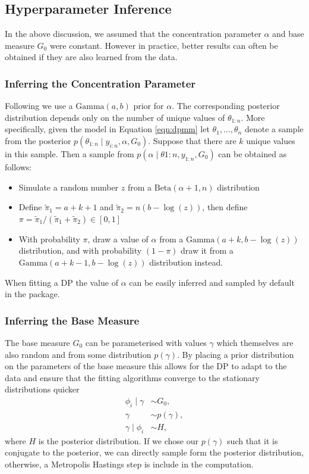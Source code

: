 \documentclass[nojss]{jss}
\begin{document}
\subsection{Hyperparameter Inference} \label{subsec:hyperparam}

In the above discussion, we assumed that the concentration parameter $\alpha$ and base measure $G_0$ were constant. However in practice, better results can often be obtained if they are also learned from the data.

\subsubsection{Inferring the Concentration Parameter}
Following \cite{west_hyperparameter_1992} we use a $\text{Gamma} (a, b)$ prior for $\alpha$. The corresponding posterior distribution depends only on the number of unique values of $\theta_{1:n}$. More specifically, given the model in Equation \eqref{eqn:dpmm} let $\theta_1,\ldots,\theta_n$ denote a sample from the posterior $p(\theta_{1:n} \mid y_{i:n} , \alpha, G_0 )$. Suppose that there are $k$ unique values in this sample. Then a sample from $p(\alpha \mid \theta{1:n}, y_{1:n} , G_0)$ can be obtained as follows:

\begin{itemize}
\item Simulate a random number $z$ from a $\text{Beta}(\alpha + 1, n)$ distribution
\item Define $\tilde{\pi}_1 = a + k + 1$ and $\tilde{\pi}_2 = n (b - \log(z))$, then define $\pi = \tilde{\pi}_1/(\tilde{\pi}_1 + \tilde{\pi}_2) \in [0, 1]$
\item With probability $\pi$, draw a value of $\alpha$ from a $\text{Gamma} (a + k, b - \log(z))$ distribution, and with probability $(1 - \pi)$ draw it from a $\text{Gamma}(a + k - 1, b - \log(z))$ distribution instead.
\end{itemize}
When fitting a DP the value of $\alpha$ can be easily inferred and sampled by default in the  package.



\subsubsection{Inferring the Base Measure}

The base measure $G_0$ can be parameterised with values $\gamma$ which themselves are also random and from some distribution $p(\gamma)$. By placing a prior distribution on the parameters of the base measure this allows for the DP to adapt to the data and ensure that the fitting algorithms converge to the stationary distributions quicker
\begin{align*}
\phi _i \mid \gamma & \sim G_0, \\
\gamma & \sim p(\gamma), \\
\gamma \mid \phi _i & \sim H,
\end{align*}
where $H$ is the posterior distribution. If we chose our $p(\gamma)$ such that it is conjugate to the posterior, we can directly sample form the posterior distribution, otherwise, a Metropolis Hastings step is include in the computation.
\end{document}

